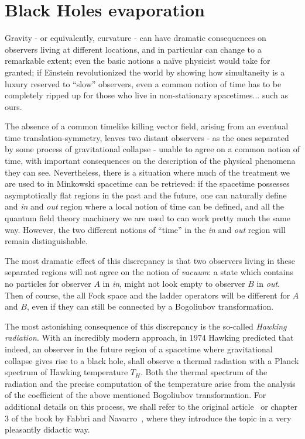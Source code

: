 
\section{Black Holes evaporation}
\label{sec:black-holes-evaporation}
Gravity - or equivalently, curvature - can have dramatic consequences on observers living at different locations, and in particular can change to a remarkable extent; even the basic notions a na\"ive physicist would take for granted; if Einstein revolutionized the world by showing how simultaneity is a luxury reserved to ``slow'' observers, even a common notion of time has to be completely ripped up for those who live in non-stationary spacetimes... such as ours.

\noindent
The absence of a common timelike killing vector field, arising from an eventual time translation-symmetry, leaves two distant observers - as the ones separated by some process of gravitational collapse - unable to agree on a common notion of time, with important consequences on the description of the physical phenomena they can see.
Nevertheless, there is a situation where much of the treatment we are used to in Minkowski spacetime can be retrieved: if the spacetime possesses asymptotically flat regions in the past and the future, one can naturally define and \emph{in} and \emph{out} region where a local notion of time can be defined, and all the quantum field theory machinery we are used to can work pretty much the same way.
However, the two different notions of ``time'' in the \emph{in} and \emph{out} region will remain distinguishable.

The most dramatic effect of this discrepancy is that two observers living in these separated regions will not agree on the notion of \emph{vacuum}: a state which contains no particles for observer \(A\) in \emph{in}, might not look empty to observer \(B\) in \emph{out}.
Then of course, the all Fock space and the ladder operators will be different for \(A\) and \(B\), even if they can still be connected by a Bogoliubov transformation.

The most astonishing consequence of this discrepancy is the so-called \emph{Hawking radiation}. With an incredibly modern approach, in \(1974\) Hawking predicted that indeed, an observer in the future region of a spacetime where gravitational collapse gives rise to a black hole, shall observe a thermal radiation with a Planck spectrum of Hawking temperature \(T_H\). Both the thermal spectrum of the radiation and the precise computation of the temperature arise from the analysis of the coefficient of the above mentioned Bogoliubov transformation. For additional details on this process, we shall refer to the original article~\cite[]{hawking1975particle} or chapter \(3\) of the book by Fabbri and Navarro~\cite[]{fabbri2005modeling}, where they introduce the topic in a very pleasantly didactic way.

